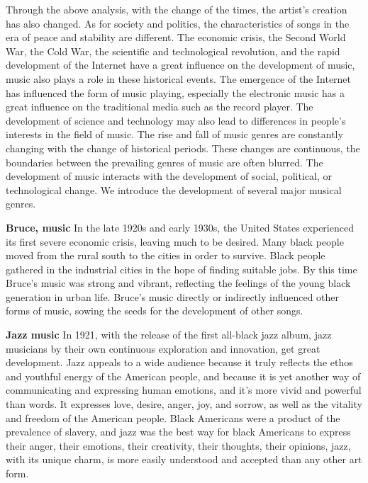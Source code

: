 \documentclass[conference]{IEEEtran}
\begin{document}
Through the above analysis, with the change of the times, the artist’s creation has also changed. As for society and politics, the characteristics of songs in the era of peace and stability are different. The economic crisis, the Second World War, the Cold War, the scientific and technological revolution, and the rapid development of the Internet have a great influence on the development of music, music also plays a role in these historical events. The emergence of the Internet has influenced the form of music playing, especially the electronic music has a great influence on the traditional media such as the record player. The development of science and technology may also lead to differences in people’s interests in the field of music. The rise and fall of music genres are constantly changing with the change of historical periods. These changes are continuous, the boundaries between the prevailing genres of music are often blurred. The development of music interacts with the development of social, political, or technological change. We introduce the development of several major musical genres.

\textbf{ Bruce, music}
In the late 1920s and early 1930s, the United States experienced its first severe economic crisis, leaving much to be desired. Many black people moved from the rural south to the cities in order to survive. Black people gathered in the industrial cities in the hope of finding suitable jobs. By this time Bruce’s music was strong and vibrant, reflecting the feelings of the young black generation in urban life. Bruce’s music directly or indirectly influenced other forms of music, sowing the seeds for the development of other songs.

\textbf{Jazz music}
In 1921, with the release of the first all-black jazz album, jazz musicians by their own continuous exploration and innovation, get great development. Jazz appeals to a wide audience because it truly reflects the ethos and youthful energy of the American people, and because it is yet another way of communicating and expressing human emotions, and it’s more vivid and powerful than words. It expresses love, desire, anger, joy, and sorrow, as well as the vitality and freedom of the American people. Black Americans were a product of the prevalence of slavery, and jazz was the best way for black Americans to express their anger, their emotions, their creativity, their thoughts, their opinions, jazz, with its unique charm, is more easily understood and accepted than any other art form.
\end{document}
